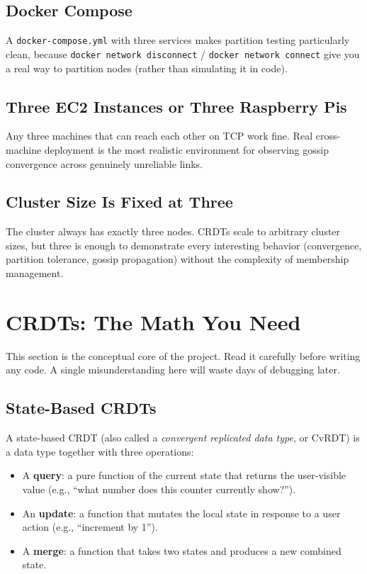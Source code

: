 \documentclass[11pt,a4paper]{article}
\begin{document}
\subsection{Docker Compose}
A \texttt{docker-compose.yml} with three services makes partition testing particularly clean, because \texttt{docker network disconnect} / \texttt{docker network connect} give you a real way to partition nodes (rather than simulating it in code).

\subsection{Three EC2 Instances or Three Raspberry Pis}
Any three machines that can reach each other on TCP work fine. Real cross-machine deployment is the most realistic environment for observing gossip convergence across genuinely unreliable links.

\subsection{Cluster Size Is Fixed at Three}
The cluster always has exactly three nodes. CRDTs scale to arbitrary cluster sizes, but three is enough to demonstrate every interesting behavior (convergence, partition tolerance, gossip propagation) without the complexity of membership management.

\section{CRDTs: The Math You Need}

This section is the conceptual core of the project. Read it carefully before writing any code. A single misunderstanding here will waste days of debugging later.

\subsection{State-Based CRDTs}
A state-based CRDT (also called a \textit{convergent replicated data type}, or CvRDT) is a data type together with three operations:

\begin{itemize}
\item A \textbf{query}: a pure function of the current state that returns the user-visible value (e.g., ``what number does this counter currently show?'').
\item An \textbf{update}: a function that mutates the local state in response to a user action (e.g., ``increment by 1'').
\item A \textbf{merge}: a function that takes two states and produces a new combined state.
\end{itemize}
\end{document}
